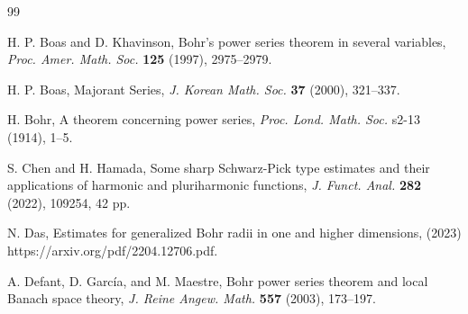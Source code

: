 \documentclass[a4paper,12pt]{amsart}
\theoremstyle{definition}
\begin{document}
\begin{thebibliography}{99}
	
	 {\sc H. P. Boas} and {\sc D. Khavinson}, Bohr's power series theorem in several variables, {\it Proc. Amer. Math. Soc.}  {\bf 125} (1997), 2975--2979.
	
		 {\sc H. P. Boas}, Majorant Series,  {\it J. Korean Math. Soc.}  {\bf 37} (2000), 321--337.
	
	 {\sc H. Bohr}, A theorem concerning power series,  {\it Proc. Lond. Math. Soc.} s2-13 (1914), 1--5.
	
	
	
	
	
	
	
	
	 {\sc S. Chen} and {\sc  H. Hamada}, Some sharp Schwarz-Pick type estimates and their applications of harmonic and pluriharmonic functions, {\it J. Funct. Anal.} {\bf 282} (2022), 109254, 42 pp.
	
	 {\sc N. Das}, Estimates for generalized Bohr radii in one and higher dimensions, (2023) https://arxiv.org/pdf/2204.12706.pdf.
	
	 {\sc A. Defant, D. Garc\'{i}a}, and {\sc  M. Maestre}, Bohr power series theorem and local Banach space theory, {\it J. Reine Angew. Math.} {\bf 557} (2003), 173--197.
	

\end{thebibliography}
\end{document}
